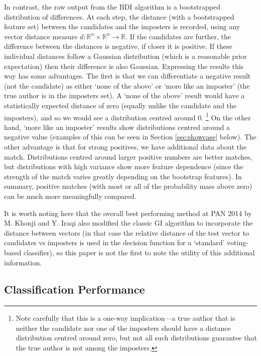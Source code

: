 \documentclass[
    hf
]{ceurart}
\begin{document}
In contrast, the raw output from the BDI algorithm is a bootstrapped
distribution of differences. At each step, the distance (with a bootstrapped
feature set) between the candidates and the imposters is recorded, using any
vector distance measure $d: \mathbb{R}^n \times \mathbb{R}^n \rightarrow
    \mathbb{R}$. If the candidates are further, the difference between the distances
is negative, if closer it is positive. If these individual distances follow a
Gaussian distribution (which is a reasonable prior expectation) then their
difference is also Gaussian. Expressing the results this way has some
advantages. The first is that we can differentiate a negative result (not the
candidate) as either `none of the above' or `more like an imposter' (the true
author is in the imposters set). A `none of the above' result would have a
statistically expected distance of zero (equally unlike the candidate and the
imposters), and so we would see a distribution centred around 0.%
%
\footnote{ Note carefully that this is a one-way implication---a true author
    that is neither the candidate nor one of the imposters should have a
    distance distribution centred around zero, but not all such distributions
    guarantee that the true author is not among the imposters.}
%
On the other hand, `more like an imposter' results show distributions centred
around a negative value (examples of this can be seen in Section
\ref{sec:showcase} below). The other advantage is that for strong positives, we
have additional data about the match. Distributions centred around larger
positive numbers are better matches, but distributions with high variance show
more feature dependence (since the strength of the match varies greatly
depending on the bootstrap features). In summary, positive matches (with most or
all of the probability mass above zero) can be much more meaningfully compared.

It is worth noting here that the overall best performing method at PAN 2014 by
M. Khonji and Y. Iraqi \cite{khonji_iraqi} also modified the classic GI
algorithm to incorporate the distance between vectors (in that case the relative
distance of the test vector to candidates vs imposters is used in the decision
function for a `standard' voting-based classifier), so this paper is not the
first to note the utility of this additional information.

\subsection{Classification Performance}
\end{document}
